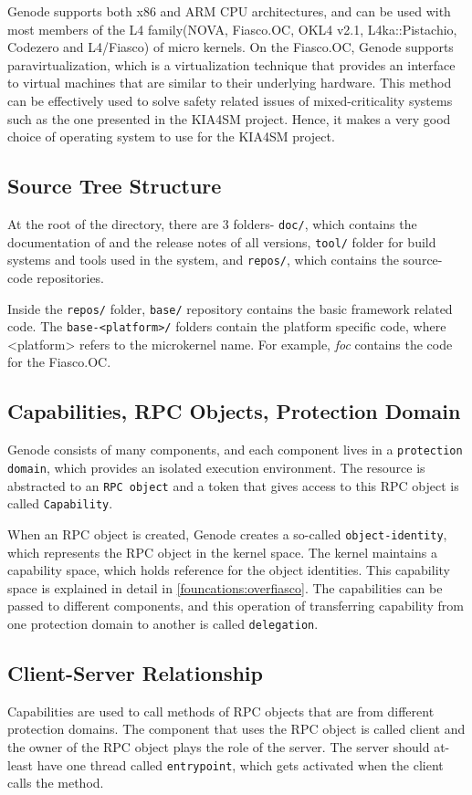 Genode supports both x86 and ARM CPU architectures, and can be used with most members of the L4 family(NOVA, Fiasco.OC, OKL4 v2.1, L4ka::Pistachio, Codezero and L4/Fiasco) of micro kernels. On the Fiasco.OC, Genode supports paravirtualization, which is a virtualization technique that provides an interface to virtual machines that are similar to their underlying hardware. This method can be effectively used to solve safety related issues of mixed-criticality systems such as the one presented in the KIA4SM project. Hence, it makes a very good choice of operating system to use for the KIA4SM project.

\subsection{Source Tree Structure}
At the root of the directory, there are 3 folders- \texttt{doc/}, which contains the documentation of and the release notes of all versions, \texttt{tool/} folder for build systems and tools used in the system, and \texttt{repos/}, which contains the source-code repositories. 

Inside the \texttt{repos/} folder, \texttt{base/} repository contains the basic framework related code. The \texttt{base-<platform>/} folders contain the platform specific code, where <platform> refers to the microkernel name. For example, \textit{foc} contains the code for the Fiasco.OC.

\subsection{Capabilities, RPC Objects, Protection Domain}\label{Foundations:cap}
Genode consists of many components, and each component lives in a \texttt{protection domain}, which provides an isolated execution environment. The resource is abstracted to an \texttt{RPC object} and a token that gives access to this RPC object is called \texttt{Capability}.

When an RPC object is created, Genode creates a so-called \texttt{object-identity}, which represents the RPC object in the kernel space. The kernel maintains a capability space, which holds reference for the object identities. This capability space is explained in detail in \ref{founcations:overfiasco}. The capabilities can be passed to different components, and this operation of transferring capability from one protection domain to another is called  \texttt{delegation}.

\subsection{Client-Server Relationship}
Capabilities are used to call methods of RPC objects that are from different protection domains. The component that uses the RPC object is called client and the owner of the RPC object plays the role of the server. The server should at-least have one thread called \texttt{entrypoint}, which gets activated when the client calls the method.

